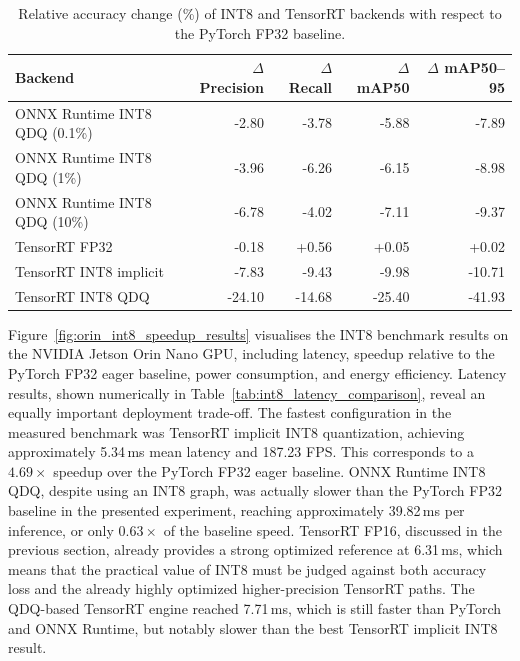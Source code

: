 \documentclass[12pt,a4paper]{report}
\begin{document}
\begin{table}[ht]
\centering
\caption{Relative accuracy change (\%) of INT8 and TensorRT backends with respect to the PyTorch FP32 baseline.}
\label{tab:int8_accuracy_relative}
\begin{tabular}{p{4.7cm}rrrr}
\toprule
Backend & $\Delta$ Precision & $\Delta$ Recall & $\Delta$ mAP50 & $\Delta$ mAP50--95 \\
\midrule
ONNX Runtime INT8 QDQ (0.1\%) & -2.80 & -3.78 & -5.88  & -7.89 \\
ONNX Runtime INT8 QDQ (1\%)   & -3.96 & -6.26 & -6.15  & -8.98 \\
ONNX Runtime INT8 QDQ (10\%)  & -6.78 & -4.02 & -7.11  & -9.37 \\
TensorRT FP32                 & -0.18 & +0.56 & +0.05  & +0.02 \\
TensorRT INT8 implicit        & -7.83 & -9.43 & -9.98  & -10.71 \\
TensorRT INT8 QDQ             & -24.10 & -14.68 & -25.40 & -41.93 \\
\bottomrule
\end{tabular}
\end{table}


Figure~\ref{fig:orin_int8_speedup_results} visualises the INT8 benchmark results
on the NVIDIA Jetson Orin Nano GPU, including latency, speedup relative to the
PyTorch FP32 eager baseline, power consumption, and energy efficiency.
Latency results, shown numerically in Table~\ref{tab:int8_latency_comparison},
reveal an equally important deployment trade-off.
The fastest configuration in the measured benchmark was TensorRT implicit INT8
quantization, achieving approximately 5.34\,ms mean latency and 187.23 FPS.
This corresponds to a $4.69\times$ speedup over the PyTorch FP32 eager baseline.
ONNX Runtime INT8 QDQ, despite using an INT8 graph, was actually slower than the
PyTorch FP32 baseline in the presented experiment, reaching approximately
39.82\,ms per inference, or only $0.63\times$ of the baseline speed.
TensorRT FP16, discussed in the previous section, already provides a strong
optimized reference at 6.31\,ms, which means that the practical value of INT8
must be judged against both accuracy loss and the already highly optimized
higher-precision TensorRT paths. The QDQ-based TensorRT engine reached
7.71\,ms, which is still faster than PyTorch and ONNX Runtime, but notably
slower than the best TensorRT implicit INT8 result.
\end{document}

